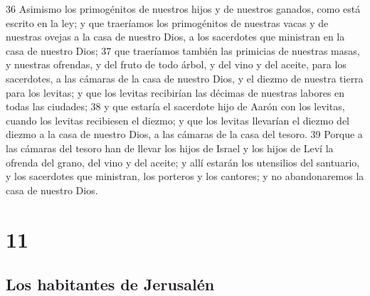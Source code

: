 36 Asimismo los primogénitos de nuestros hijos y de nuestros ganados, como está escrito en la ley; y que traeríamos los primogénitos de nuestras vacas y de nuestras ovejas a la casa de nuestro Dios, a los sacerdotes que ministran en la casa de nuestro Dios; 
37 que traeríamos también las primicias de nuestras masas, y nuestras ofrendas, y del fruto de todo árbol, y del vino y del aceite, para los sacerdotes, a las cámaras de la casa de nuestro Dios, y el diezmo de nuestra tierra para los levitas; y que los levitas recibirían las décimas de nuestras labores en todas las ciudades;
38 y que estaría el sacerdote hijo de Aarón con los levitas, cuando los levitas recibiesen el diezmo; y que los levitas llevarían el diezmo del diezmo a la casa de nuestro Dios, a las cámaras de la casa del tesoro.
39 Porque a las cámaras del tesoro han de llevar los hijos de Israel y los hijos de Leví la ofrenda del grano, del vino y del aceite; y allí estarán los utensilios del santuario, y los sacerdotes que ministran, los porteros y los cantores; y no abandonaremos la casa de nuestro Dios.

\chapter{11}

\section*{Los habitantes de Jerusalén}

